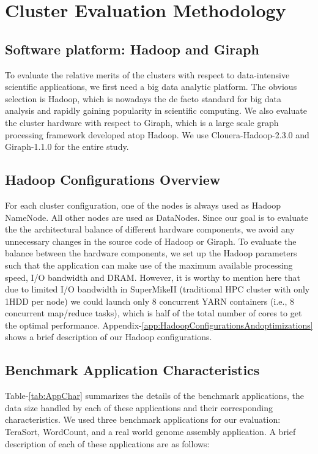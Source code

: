 \documentclass[journal]{IEEEtran}
\begin{document}
\section{Cluster Evaluation Methodology} \label{sec:EvalMethod}

\subsection{Software platform: Hadoop and Giraph}
To evaluate the relative merits of the clusters with respect to data-intensive scientific applications, we first need a big data analytic platform. The obvious selection is Hadoop, which is nowadays the de facto standard for big data analysis and rapidly gaining popularity in scientific computing. We also evaluate the cluster hardware with respect to Giraph, which is a large scale graph processing framework developed atop Hadoop. We use Clouera-Hadoop-2.3.0 and Giraph-1.1.0 for the entire study. 

\subsection{Hadoop Configurations Overview}
For each cluster configuration, one of the nodes is always used as Hadoop NameNode. All other nodes are used as DataNodes. Since our goal is to evaluate the  the architectural balance of different hardware components, we avoid any unnecessary changes in the source code of Hadoop or Giraph. To evaluate the balance between the hardware components, we set up the Hadoop parameters such that the application can make use of the maximum available processing speed, I/O bandwidth and DRAM. However, it is worthy to mention here that due to limited I/O bandwidth in SuperMikeII (traditional HPC cluster with only 1HDD per node) we could launch only 8 concurrent YARN containers (i.e., 8 concurrent map/reduce tasks), which is half of the total number of cores to get the optimal performance. Appendix-\ref{app:HadoopConfigurationsAndoptimizations} shows a brief description of our Hadoop configurations.

\subsection{Benchmark Application Characteristics}
Table-\ref{tab:AppChar} summarizes the details of the benchmark applications, the data size handled by each of these applications and their corresponding characteristics. We used three benchmark applications for our evaluation: TeraSort, WordCount, and a real world genome assembly application. A brief description of each of these applications are as follows:
\end{document}
